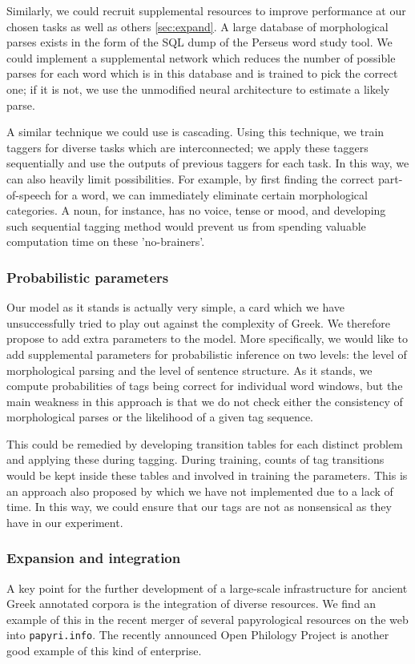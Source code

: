 Similarly, we could recruit supplemental resources to improve
performance at our chosen tasks as well as others \ref{sec:expand}. A
large database of morphological parses exists in the form of the SQL
dump of the Perseus word study tool. We could implement a supplemental
network which reduces the number of possible parses for each word
which is in this database and is trained to pick the correct one; if
it is not, we use the unmodified neural architecture to estimate a
likely parse.

A similar technique we could use is cascading. Using this technique,
we train taggers for diverse tasks which are interconnected; we apply
these taggers sequentially and use the outputs of previous taggers for
each task. In this way, we can also heavily limit possibilities. For
example, by first finding the correct part-of-speech for a word, we
can immediately eliminate certain morphological categories. A noun,
for instance, has no voice, tense or mood, and developing such
sequential tagging method would prevent us from spending valuable
computation time on these 'no-brainers'.

\subsubsection{Probabilistic parameters}
Our model as it stands is actually very simple, a card which we have
unsuccessfully tried to play out against the complexity of Greek. We
therefore propose to add extra parameters to the model. More
specifically, we would like to add supplemental parameters for
probabilistic inference on two levels: the level of morphological
parsing and the level of sentence structure. As it stands, we compute
probabilities of tags being correct for individual word windows, but
the main weakness in this approach is that we do not check either the
consistency of morphological parses or the likelihood of a given tag
sequence.

This could be remedied by developing transition tables for each
distinct problem and applying these during tagging. During training,
counts of tag transitions would be kept inside these tables and
involved in training the parameters. This is an approach also proposed
by \cite{collobert-2011} which we have not implemented due to a lack
of time. In this way, we could ensure that our tags are not as
nonsensical as they have in our experiment.

\subsubsection{Expansion and integration}
A key point for the further development of a large-scale
infrastructure for ancient Greek annotated corpora is the integration
of diverse resources. We find an example of this in the recent
merger of several papyrological resources on the web into
\texttt{papyri.info}. The recently announced Open Philology Project
\citep{crane2013} is another good example of this kind of enterprise.

